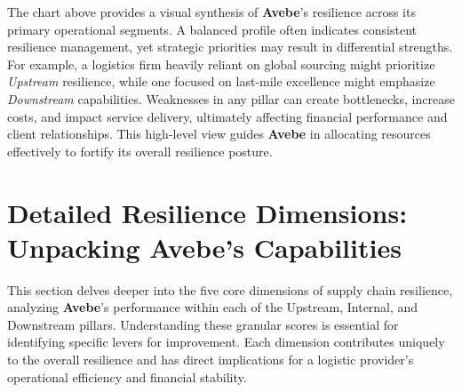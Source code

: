 \documentclass[
  oneside,
  open=any,
  fontsize=11pt]{scrbook}
\begin{document}
The chart above provides a visual synthesis of \textbf{Avebe}'s
resilience across its primary operational segments. A balanced profile
often indicates consistent resilience management, yet strategic
priorities may result in differential strengths. For example, a
logistics firm heavily reliant on global sourcing might prioritize
\emph{Upstream} resilience, while one focused on last-mile excellence
might emphasize \emph{Downstream} capabilities. Weaknesses in any pillar
can create bottlenecks, increase costs, and impact service delivery,
ultimately affecting financial performance and client relationships.
This high-level view guides \textbf{Avebe} in allocating resources
effectively to fortify its overall resilience posture.

\chapter{Detailed Resilience Dimensions: Unpacking Avebe's
Capabilities}\label{detailed-resilience-dimensions-unpacking-avebes-capabilities}

This section delves deeper into the five core dimensions of supply chain
resilience, analyzing \textbf{Avebe}'s performance within each of the
Upstream, Internal, and Downstream pillars. Understanding these granular
scores is essential for identifying specific levers for improvement.
Each dimension contributes uniquely to the overall resilience and has
direct implications for a logistic provider's operational efficiency and
financial stability.
\end{document}
